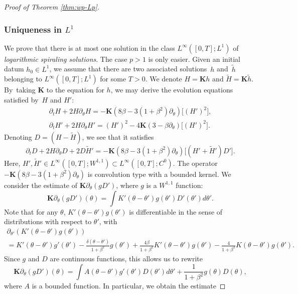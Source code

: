 \documentclass[10pt]{amsart}
\theoremstyle{plain}
\theoremstyle{definition}
\let\rd\partial
\let\bt\beta
\let\dlt\delta
\let\tht\theta
\newcommand{\bfK}{{\mathbf K}}
\begin{document}
\begin{proof}[Proof of Theorem \ref{thm:wp-Lp}]
\subsubsection{Uniqueness in $L^1$}
We prove that there is at most one solution in the class $L^\infty([0,T];L^1)$ of \textit{logarithmic spiraling solutions}. The case $p>1$ is only easier. Given an initial datum $h_0 \in L^1$, we assume that there are two associated solutions~$h$ and~$\tilde{h}$ belonging to $L^\infty([0,T];L^1)$ for some $T>0$. We denote $H = \bfK h$ and $\tilde{H} = \bfK\tilde{h}$. By~taking $\bfK$ to the equation for $h$, we may derive the evolution equations satisfied by~$H$ and $H'$:
\begin{align}\label{eq:H}
\rd_tH + 2H \rd_\tht H = -\bfK(8\bt - 3(1+\bt^2)\rd_\tht)\bigl[ (H')^2 \bigr],\\
\label{eq:H-prime}
\rd_t H' + 2H \rd_\tht H' = (H')^2 - 4 \bfK (3-\bt\rd_\tht)\bigl[ (H')^2 \bigr].
\end{align}
Denoting $D = (H-\tilde{H}) $, we see that it satisfies
\begin{equation}\label{eq:D}
\rd_t D + 2H \rd_\tht D + 2D\tilde{H}' = - \bfK(8\bt -3(1+\bt^2)\rd_\tht) \bigl[ (H'+ \tilde{H}')D' \bigr].
\end{equation}
Here, $H', \tilde{H}' \in L^\infty([0,T];W^{1,1}) \subset L^\infty([0,T];C^0)$. The operator $ - \bfK(8\bt -3(1+\bt^2)\rd_\tht) $ is convolution type with a bounded kernel. We consider the estimate of $\bfK\rd_\tht (g D')$, where $g$ is a $W^{1,1}$ function:
\begin{equation*}
\bfK\rd_\tht (g D')(\tht) = \int K'(\tht-\tht') g(\tht') D'(\tht') d\tht'.
\end{equation*}
Note that for any $\tht$, $K'(\tht-\tht') g(\tht')$ is differentiable in the sense of distributions with respect to $\tht'$, with
\begin{multline*}
\rd_{\tht'} \left(K'(\tht-\tht') g(\tht') \right)\\
= K'(\tht-\tht') g'(\tht') - \frac{\dlt(\tht-\tht')}{1+\bt^2}g(\tht') + \frac{4\bt}{1+\bt^2}K'(\tht-\tht')g(\tht') - \frac{4}{1+\bt^2}K(\tht-\tht') g(\tht').
\end{multline*} Since $g$ and $D$ are continuous functions, this allows us to rewrite
\begin{equation*}
\bfK\rd_\tht (g D')(\tht) = \int A(\tht-\tht')g'(\tht')D(\tht')d\tht' + \frac{1}{1+\bt^2} g(\tht) D(\tht),
\end{equation*}
where $A$ is a bounded function. In particular, we obtain the estimate

\end{proof}
\end{document}
